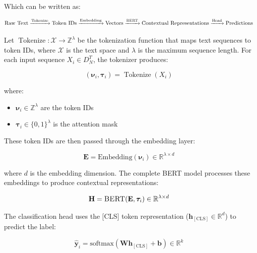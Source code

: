 \documentclass[onecolumn, journal, english, 12pt, a4paper]{IEEEtran} %
\DeclareMathOperator{\Tokenize}{Tokenize}
\newcommand{\bertmodel}{\textsc{BERT}}
\theoremstyle{definition}
\begin{document}
Which can be written as:

\begin{equation*}
\text{Raw Text} \xrightarrow{\Tokenize} \text{Token IDs} \xrightarrow{\text{Embedding}} \text{Vectors} \xrightarrow{\bertmodel} \text{Contextual Representations} \xrightarrow{\text{Head}} \text{Predictions}
\end{equation*}

Let $\Tokenize: \mathcal{X} \rightarrow \mathbb{Z}^\lambda$ be the
tokenization function that maps text sequences to token IDs, where
$\mathcal{X}$ is the text space and $\lambda$ is the maximum sequence
length. For each input sequence $X_i \in D^T_N$, the tokenizer
produces:

\begin{equation}\label{eq:tokenization}
    (\boldsymbol{\nu}_i, \boldsymbol{\tau}_i) = \Tokenize(X_i)
\end{equation}

where:
\begin{itemize}
    \item $\boldsymbol{\nu}_i \in \mathbb{Z}^\lambda$ are the token IDs
    \item $\boldsymbol{\tau}_i \in \{0,1\}^\lambda$ is the attention mask
\end{itemize}

These token IDs are then passed through the embedding layer:

\begin{equation}\label{eq:embedding}
    \mathbf{E} = \text{Embedding}(\boldsymbol{\nu}_i) \in \mathbb{R}^{\lambda \times d}
\end{equation}

where $d$ is the embedding dimension. The complete \bertmodel{} model
processes these embeddings to produce contextual representations:

\begin{equation}\label{eq:encoding}
    \mathbf{H} = \bertmodel{}(\mathbf{E}, \boldsymbol{\tau}_i) \in \mathbb{R}^{\lambda \times d}
\end{equation}

The classification head uses the [CLS] token representation
($\mathbf{h}_{[\text{CLS}]} \in \mathbb{R}^d$) to predict the label:

\begin{equation}\label{eq:classification}
  \hat{\boldsymbol{y}}_i = \text{softmax}(\mathbf{W}\mathbf{h}_{[\text{CLS}]} + \mathbf{b}) \in \mathbb{R}^k
\end{equation}
\end{document}

